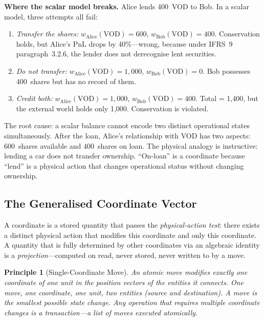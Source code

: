 \documentclass[11pt,a4paper]{article}
\newtheorem{principle}[definition]{Principle}
\begin{document}
\medskip
\noindent\textbf{Where the scalar model breaks.} Alice lends 400~VOD to Bob. In a scalar model, three attempts all fail:

\begin{enumerate}[nosep]
\item \emph{Transfer the shares:} $w_{\mathrm{Alice}}(\text{VOD}) = 600$, $w_{\mathrm{Bob}}(\text{VOD}) = 400$. Conservation holds, but Alice's PnL drops by 40\%---wrong, because under IFRS~9 paragraph~3.2.6, the lender does not derecognise lent securities.
\item \emph{Do not transfer:} $w_{\mathrm{Alice}}(\text{VOD}) = 1{,}000$, $w_{\mathrm{Bob}}(\text{VOD}) = 0$. Bob possesses 400~shares but has no record of them.
\item \emph{Credit both:} $w_{\mathrm{Alice}}(\text{VOD}) = 1{,}000$, $w_{\mathrm{Bob}}(\text{VOD}) = 400$. Total = 1{,}400, but the external world holds only 1{,}000. Conservation is violated.
\end{enumerate}

\noindent The root cause: a scalar balance cannot encode two distinct operational states simultaneously. After the loan, Alice's relationship with VOD has two aspects: 600~shares available and 400~shares on loan. The physical analogy is instructive: lending a car does not transfer ownership. ``On-loan'' is a coordinate because ``lend'' is a physical action that changes operational status without changing ownership.

\subsection{The Generalised Coordinate Vector}
\label{sec:position-vector}

A coordinate is a stored quantity that passes the \emph{physical-action test}: there exists a distinct physical action that modifies this coordinate and only this coordinate. A quantity that is fully determined by other coordinates via an algebraic identity is a \emph{projection}---computed on read, never stored, never written to by a move.

\begin{principle}[Single-Coordinate Move]
\label{princ:single-coord}
An atomic move modifies exactly one coordinate of one unit in the position vectors of the entities it connects. One move, one coordinate, one unit, two entities (source and destination). A move is the smallest possible state change. Any operation that requires multiple coordinate changes is a \emph{transaction}---a list of moves executed atomically.
\end{principle}
\end{document}
